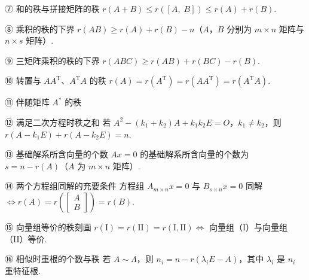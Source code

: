 \begin{fkey}{⑦ 和的秩与拼接矩阵的秩}
$r(A+B)\le r([A,\;B])\le r(A)+r(B)$.
\end{fkey}

\begin{fcard}{⑧ 乘积的秩的下界}
$r(AB)\ge r(A)+r(B)-n$（$A$，$B$ 分别为 $m\times n$ 矩阵与 $n\times s$ 矩阵）.
\end{fcard}

\begin{fcard}{⑨ 三矩阵乘积的秩的下界}
$r(ABC)\ge r(AB)+r(BC)-r(B)$.
\end{fcard}

\begin{fcard}{⑩ 转置与 $AA^{\mathrm T}$、$A^{\mathrm T}A$ 的秩}
$r(A)=r(A^{\mathrm T})=r(AA^{\mathrm T})=r(A^{\mathrm T}A)$.
\end{fcard}

\begin{fcard}{⑪ 伴随矩阵 $A^*$ 的秩}
\end{fcard}

\begin{fcard}{⑫ 满足二次方程时秩之和}
若 $A^{2}-(k_1+k_2)A+k_1k_2E=O$，$k_1\ne k_2$，则 $r(A-k_1E)+r(A-k_2E)=n$.
\end{fcard}

\begin{fcard}{⑬ 基础解系所含向量的个数}
$Ax=0$ 的基础解系所含向量的个数为 $s=n-r(A)$（$A$ 为 $m\times n$ 矩阵）.
\end{fcard}

\begin{fcard}{⑭ 两个方程组同解的充要条件}
方程组 $A_{m\times n}x=0$ 与 $B_{s\times n}x=0$ 同解 $\Leftrightarrow r(A)=r\left(\begin{bmatrix}A\\B\end{bmatrix}\right)=r(B)$.
\end{fcard}

\begin{fcard}{⑮ 向量组等价的秩刻画}
$r(\mathrm{I})=r(\mathrm{II})=r(\mathrm{I},\mathrm{II})\Leftrightarrow$ 向量组（I）与向量组（II）等价.
\end{fcard}

\begin{fcard}{⑯ 相似时重根的个数与秩}
若 $A\sim\Lambda$，则 $n_i=n-r(\lambda_iE-A)$，其中 $\lambda_i$ 是 $n_i$ 重特征根.
\end{fcard}

